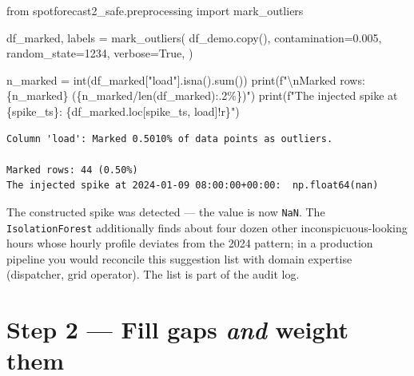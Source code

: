 \documentclass[
  english,
  letterpaper,
]{scrbook}
\newenvironment{Shaded}{\begin{snugshade}}{\end{snugshade}}
\newcommand{\BuiltInTok}[1]{\textcolor[rgb]{0.00,0.23,0.31}{#1}}
\newcommand{\CharTok}[1]{\textcolor[rgb]{0.13,0.47,0.30}{#1}}
\newcommand{\DecValTok}[1]{\textcolor[rgb]{0.68,0.00,0.00}{#1}}
\newcommand{\FloatTok}[1]{\textcolor[rgb]{0.68,0.00,0.00}{#1}}
\newcommand{\ImportTok}[1]{\textcolor[rgb]{0.00,0.46,0.62}{#1}}
\newcommand{\NormalTok}[1]{\textcolor[rgb]{0.00,0.23,0.31}{#1}}
\newcommand{\OperatorTok}[1]{\textcolor[rgb]{0.37,0.37,0.37}{#1}}
\newcommand{\SpecialCharTok}[1]{\textcolor[rgb]{0.37,0.37,0.37}{#1}}
\newcommand{\SpecialStringTok}[1]{\textcolor[rgb]{0.13,0.47,0.30}{#1}}
\newcommand{\StringTok}[1]{\textcolor[rgb]{0.13,0.47,0.30}{#1}}
\newcommand{\VariableTok}[1]{\textcolor[rgb]{0.07,0.07,0.07}{#1}}
\begin{document}
\protect{}\label{mark-outliers}
\begin{Shaded}
\begin{Highlighting}[]
\ImportTok{from}\NormalTok{ spotforecast2\_safe.preprocessing }\ImportTok{import}\NormalTok{ mark\_outliers}

\NormalTok{df\_marked, labels }\OperatorTok{=}\NormalTok{ mark\_outliers(}
\NormalTok{    df\_demo.copy(),}
\NormalTok{    contamination}\OperatorTok{=}\FloatTok{0.005}\NormalTok{,}
\NormalTok{    random\_state}\OperatorTok{=}\DecValTok{1234}\NormalTok{,}
\NormalTok{    verbose}\OperatorTok{=}\VariableTok{True}\NormalTok{,}
\NormalTok{)}

\NormalTok{n\_marked }\OperatorTok{=} \BuiltInTok{int}\NormalTok{(df\_marked[}\StringTok{"load"}\NormalTok{].isna().}\BuiltInTok{sum}\NormalTok{())}
\BuiltInTok{print}\NormalTok{(}\SpecialStringTok{f"}\CharTok{\textbackslash{}n}\SpecialStringTok{Marked rows: }\SpecialCharTok{\{}\NormalTok{n\_marked}\SpecialCharTok{\}}\SpecialStringTok{ (}\SpecialCharTok{\{}\NormalTok{n\_marked}\OperatorTok{/}\BuiltInTok{len}\NormalTok{(df\_marked)}\SpecialCharTok{:.2\%\}}\SpecialStringTok{)"}\NormalTok{)}
\BuiltInTok{print}\NormalTok{(}\SpecialStringTok{f"The injected spike at }\SpecialCharTok{\{}\NormalTok{spike\_ts}\SpecialCharTok{\}}\SpecialStringTok{:  }\SpecialCharTok{\{}\NormalTok{df\_marked}\SpecialCharTok{.}\NormalTok{loc[spike\_ts, }\StringTok{\textquotesingle{}load\textquotesingle{}}\NormalTok{]}\SpecialCharTok{!r\}}\SpecialStringTok{"}\NormalTok{)}
\end{Highlighting}
\end{Shaded}

\begin{verbatim}
Column 'load': Marked 0.5010% of data points as outliers.

Marked rows: 44 (0.50%)
The injected spike at 2024-01-09 08:00:00+00:00:  np.float64(nan)
\end{verbatim}

The constructed spike was detected --- the value is now \texttt{NaN}.
The \texttt{IsolationForest} additionally finds about four dozen other
inconspicuous-looking hours whose hourly profile deviates from the 2024
pattern; in a production pipeline you would reconcile this suggestion
list with domain expertise (dispatcher, grid operator). The list is part
of the audit log.

\section{\texorpdfstring{Step 2 --- Fill gaps \emph{and} weight
them}{Step 2 --- Fill gaps and weight them}}\label{step-2-fill-gaps-and-weight-them}
\end{document}
